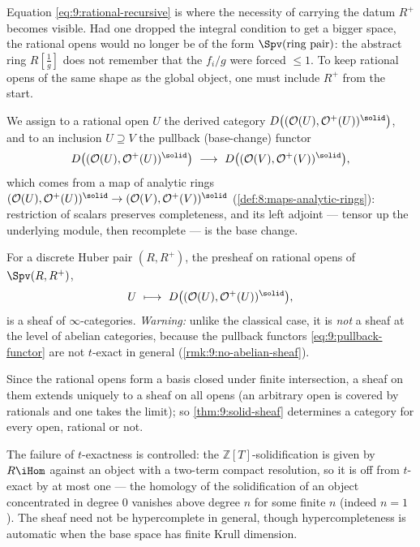 \begin{remark}
\label{rmk:9:why-Rplus}
Equation \eqref{eq:9:rational-recursive} is where the necessity of carrying the
datum $R^{+}$ becomes visible. Had one dropped the integral condition to get a
bigger space, the rational opens would no longer be of the form
$\Spv(\text{ring pair})$: the abstract ring $R[\tfrac1g]$ does not remember that
the $f_{i}/g$ were forced $\le 1$. To keep rational opens of the same shape as
the global object, one must include $R^{+}$ from the start.
\end{remark}

We assign to a rational open $U$ the derived category $D\bigl((\mathcal O(U),
\mathcal O^{+}(U))^{\solid}\bigr)$, and to an inclusion $U\supseteq V$ the
pullback (base-change) functor
\begin{equation}
\label{eq:9:pullback-functor}
D\bigl((\mathcal O(U),\mathcal O^{+}(U))^{\solid}\bigr)\ \longrightarrow\
D\bigl((\mathcal O(V),\mathcal O^{+}(V))^{\solid}\bigr),
\end{equation}
which comes from a map of analytic rings $(\mathcal O(U),\mathcal O^{+}(U))^{
\solid}\to(\mathcal O(V),\mathcal O^{+}(V))^{\solid}$ (\cref{def:8:maps-analytic-rings}):
restriction of scalars preserves completeness, and its left adjoint --- tensor
up the underlying module, then recomplete --- is the base change.

\begin{theorem}
\label{thm:9:solid-sheaf}
For a discrete Huber pair $(R,R^{+})$, the presheaf on rational opens of
$\Spv(R,R^{+})$,
\begin{equation*}
U\ \longmapsto\ D\bigl((\mathcal O(U),\mathcal O^{+}(U))^{\solid}\bigr),
\end{equation*}
is a sheaf of $\infty$-categories. \emph{Warning:} unlike the classical case, it
is \emph{not} a sheaf at the level of abelian categories, because the pullback
functors \eqref{eq:9:pullback-functor} are not $t$-exact in general
(\cref{rmk:9:no-abelian-sheaf}).
\end{theorem}

Since the rational opens form a basis closed under finite intersection, a sheaf
on them extends uniquely to a sheaf on all opens (an arbitrary open is covered
by rationals and one takes the limit); so \cref{thm:9:solid-sheaf} determines a
category for every open, rational or not.

\begin{remark}
\label{rmk:9:bounded-discrepancy}
The failure of $t$-exactness is controlled: the $\mathbb{Z}[T]$-solidification is
given by $R\iHom$ against an object with a two-term compact resolution, so it is
off from $t$-exact by at most one --- the homology of the solidification of an
object concentrated in degree $0$ vanishes above degree $n$ for some finite $n$
(indeed $n=1$). The sheaf need not be hypercomplete in general, though
hypercompleteness is automatic when the base space has finite Krull dimension.
\end{remark}

